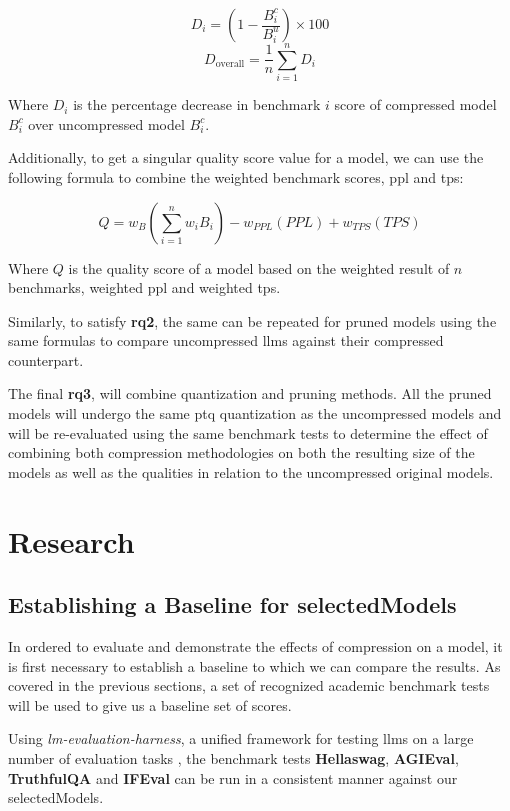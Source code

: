 \documentclass{ifacconf}
\begin{document}
	$$
	D_i = \left(1 - \frac{B_i^c}{B_i^u}\right) \times 100
	$$
	$$
	D_{\text{overall}} = \frac{1}{n} \sum_{i=1}^{n} D_i
	$$
	
	Where $D_i$ is the percentage decrease in benchmark $i$ score of compressed model $B_i^c$ over uncompressed model $B_i^c$.
	
	Additionally, to get a singular quality score value for a model, we can use the following formula to combine the weighted benchmark scores, \gls{ppl} and \gls{tps}:
	
	$$
	Q = w_{B} \left( \sum_{i=1}^{n} w_i B_i \right) - w_{PPL} \left( PPL \right) + w_{TPS}(TPS) 
	$$
	
	Where $Q$ is the quality score of a model based on the weighted result of $n$ benchmarks, weighted \gls{ppl} and weighted \gls{tps}.
	
	Similarly, to satisfy \textbf{\gls{rq}2}, the same can be repeated for pruned models using the same formulas to compare uncompressed \glspl{llm} against their compressed counterpart.
	
	The final \textbf{\gls{rq}3}, will combine quantization and pruning methods. All the pruned models will undergo the same \gls{ptq} quantization as the uncompressed models and will be re-evaluated using the same benchmark tests to determine the effect of combining both compression methodologies on both the resulting size of the models as well as the qualities in relation to the uncompressed original models.
	
	\section{Research}
	\subsection{Establishing a Baseline for \gls{selectedModels}}
	In ordered to evaluate and demonstrate the effects of compression on a model, it is first necessary to establish a baseline to which we can compare the results. As covered in the previous sections, a set of recognized academic benchmark tests will be used to give us a baseline set of scores.
	
	Using \textit{lm-evaluation-harness}, a unified framework for testing \glspl{llm} on a large number of evaluation tasks \cite{eval-harness}, the benchmark tests \textbf{Hellaswag}, \textbf{AGIEval}, \textbf{TruthfulQA} and \textbf{IFEval} can be run in a consistent manner against our \gls{selectedModels}.
	
\end{document}
